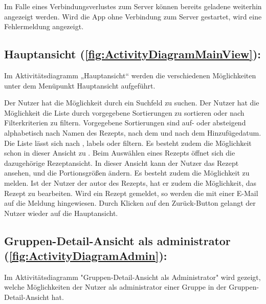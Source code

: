 \documentclass[parskip=full]{scrartcl}
\begin{document}
Im Falle eines Verbindungsverlustes zum Server können bereits geladene  weiterhin angezeigt werden. Wird die App ohne Verbindung zum Server gestartet, wird eine Fehlermeldung angezeigt.

\subsection{Hauptansicht (\autoref{fig:ActivityDiagramMainView}):}

Im Aktivitätsdiagramm „Hauptansicht“
werden die verschiedenen Möglichkeiten unter dem Menüpunkt Hauptansicht aufgeführt.


Der Nutzer hat die Möglichkeit  durch ein Suchfeld zu suchen.
Der Nutzer hat die Möglichkeit die Liste durch vorgegebene Sortierungen zu sortieren oder nach Filterkriterien zu filtern.
Vorgegebene Sortierungen sind auf- oder absteigend alphabetisch nach Namen des Rezepts, nach dem  und nach dem Hinzufügedatum.
Die Liste lässt sich nach , \Gls{labels} oder  filtern.
Es besteht zudem die Möglichkeit  schon in dieser Ansicht zu .\newline
Beim Auswählen eines Rezepts öffnet sich die dazugehörige Rezeptansicht.
In dieser Ansicht kann der Nutzer das Rezept ansehen,  und die Portionsgrößen ändern.
Es besteht zudem die Möglichkeit  zu melden.
Ist der Nutzer der \gls{autor} des Rezepts, hat er zudem die Möglichkeit, das Rezept zu bearbeiten.
Wird ein Rezept gemeldet, so werden die  mit einer E-Mail auf die Meldung hingewiesen.\newline
Durch Klicken auf den Zurück-Button gelangt der Nutzer wieder auf die Hauptansicht.\par


\subsection{Gruppen-Detail-Ansicht als \Gls{administrator} (\autoref{fig:ActivityDiagramAdmin}):}

Im Aktivitätsdiagramm "Gruppen-Detail-Ansicht als Administrator" wird gezeigt, welche Möglichkeiten der Nutzer als \Gls{administrator} einer Gruppe in der Gruppen-Detail-Ansicht hat.
\end{document}
